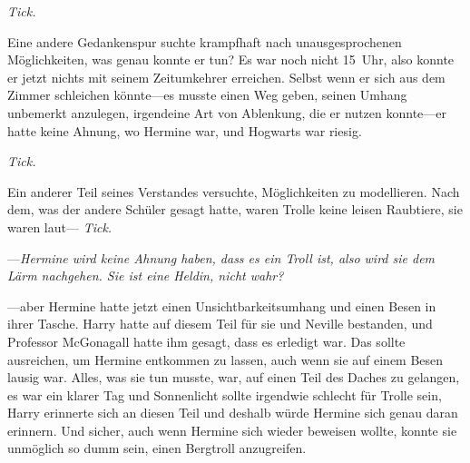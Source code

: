 \emph{Tick.}

Eine andere Gedankenspur suchte krampfhaft nach unausgesprochenen Möglichkeiten, was genau konnte er tun? Es war noch nicht 15~Uhr, also konnte er jetzt nichts mit seinem Zeitumkehrer erreichen. Selbst wenn er sich aus dem Zimmer schleichen könnte—es musste einen Weg geben, seinen Umhang unbemerkt anzulegen, irgendeine Art von Ablenkung, die er nutzen konnte—er hatte keine Ahnung, wo Hermine war, und Hogwarts war riesig.

\emph{Tick.}

Ein anderer Teil seines Verstandes versuchte, Möglichkeiten zu modellieren. Nach dem, was der andere Schüler gesagt hatte, waren Trolle keine leisen Raubtiere, sie waren laut—
\emph{Tick.}


—\emph{Hermine wird keine Ahnung haben, dass es ein Troll ist, also wird sie dem Lärm nachgehen. Sie ist eine Heldin, nicht wahr?}

—aber Hermine hatte jetzt einen Unsichtbarkeitsumhang und einen Besen in ihrer Tasche. Harry hatte auf diesem Teil für sie und Neville bestanden, und Professor McGonagall hatte ihm gesagt, dass es erledigt war. Das sollte ausreichen, um Hermine entkommen zu lassen, auch wenn sie auf einem Besen lausig war. Alles, was sie tun musste, war, auf einen Teil des Daches zu gelangen, es war ein klarer Tag und Sonnenlicht sollte irgendwie schlecht für Trolle sein, Harry erinnerte sich an diesen Teil und deshalb würde Hermine sich genau daran erinnern. Und sicher, auch wenn Hermine sich wieder beweisen wollte, konnte sie unmöglich so dumm sein, einen Bergtroll anzugreifen.

